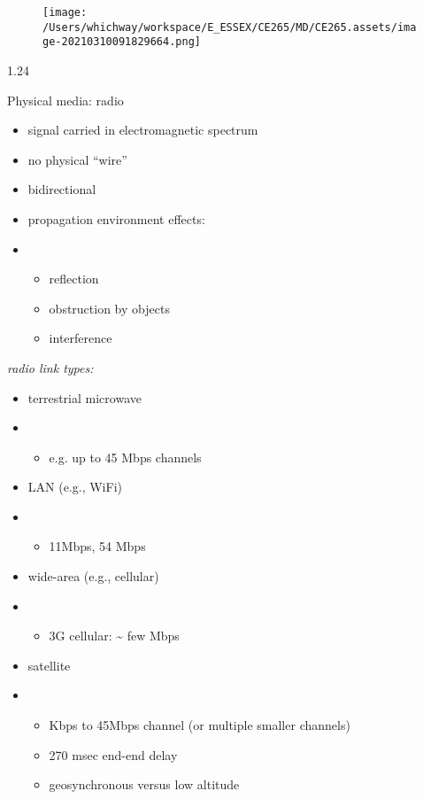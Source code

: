 \documentclass[
]{article}
\begin{document}
\begin{figure}
\centering
\texttt{[image: /Users/whichway/workspace/E\_ESSEX/CE265/MD/CE265.assets/image-20210310091829664.png]}
\caption{}
\end{figure}

1.24

Physical media: radio

\begin{itemize}
\item
  signal carried in electromagnetic spectrum
\item
  no physical ``wire''
\item
  bidirectional
\item
  propagation environment effects:
\item
  \begin{itemize}
  \item
    reflection
  \item
    obstruction by objects
  \item
    interference
  \end{itemize}
\end{itemize}

\emph{radio link types:}

\begin{itemize}
\item
  terrestrial microwave
\item
  \begin{itemize}
  \item
    e.g. up to 45 Mbps channels
  \end{itemize}
\item
  LAN (e.g., WiFi)
\item
  \begin{itemize}
  \item
    11Mbps, 54 Mbps
  \end{itemize}
\item
  wide-area (e.g., cellular)
\item
  \begin{itemize}
  \item
    3G cellular: \textasciitilde{} few Mbps
  \end{itemize}
\item
  satellite
\item
  \begin{itemize}
  \item
    Kbps to 45Mbps channel (or multiple smaller channels)
  \item
    270 msec end-end delay
  \item
    geosynchronous versus low altitude
  \end{itemize}
\end{itemize}
\end{document}
